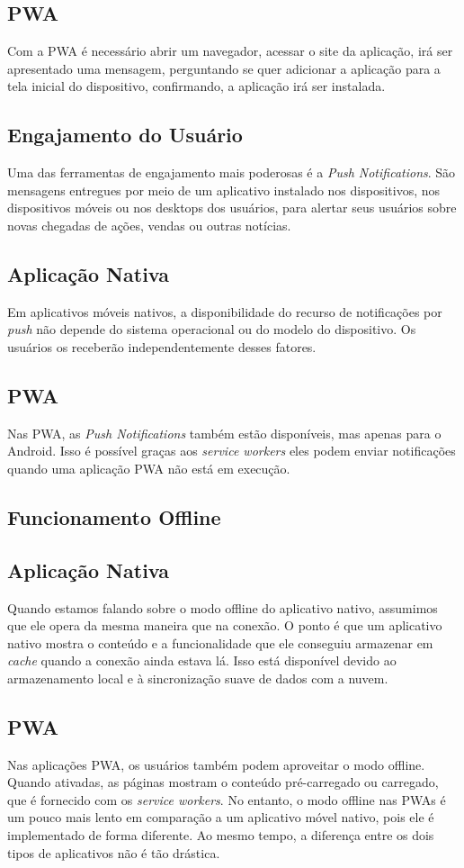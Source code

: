 \subsection*{PWA}
Com a \ac{PWA} é necessário abrir um navegador, acessar o site da aplicação, irá ser apresentado uma mensagem, perguntando se quer adicionar a aplicação para a tela inicial do dispositivo, confirmando, a aplicação irá ser instalada.

\subsection{Engajamento do Usuário}
Uma das ferramentas de engajamento mais poderosas é a \textit{Push Notifications}. São mensagens entregues por meio de um aplicativo instalado nos dispositivos, nos dispositivos móveis ou nos desktops dos usuários, para alertar seus usuários sobre novas chegadas de ações, vendas ou outras notícias.

\subsection*{Aplicação Nativa}
Em aplicativos móveis nativos, a disponibilidade do recurso de notificações por \textit{push} não depende do sistema operacional ou do modelo do dispositivo. Os usuários os receberão independentemente desses fatores.

\subsection*{PWA}
Nas \ac{PWA}, as \textit{Push Notifications} também estão disponíveis, mas apenas para o Android. Isso é possível graças aos \textit{service workers} eles podem enviar notificações quando uma aplicação \ac{PWA} não está em execução.

\subsection{Funcionamento Offline}
\subsection*{Aplicação Nativa}
Quando estamos falando sobre o modo offline do aplicativo nativo, assumimos que ele opera da mesma maneira que na conexão. O ponto é que um aplicativo nativo mostra o conteúdo e a funcionalidade que ele conseguiu armazenar em \textit{cache} quando a conexão ainda estava lá. Isso está disponível devido ao armazenamento local e à sincronização suave de dados com a nuvem.

\subsection*{PWA}
Nas aplicações \ac{PWA}, os usuários também podem aproveitar o modo offline. Quando ativadas, as páginas mostram o conteúdo pré-carregado ou carregado, que é fornecido com os \textit{service workers}. No entanto, o modo offline nas \ac{PWA}s é um pouco mais lento em comparação a um aplicativo móvel nativo, pois ele é implementado de forma diferente. Ao mesmo tempo, a diferença entre os dois tipos de aplicativos não é tão drástica.